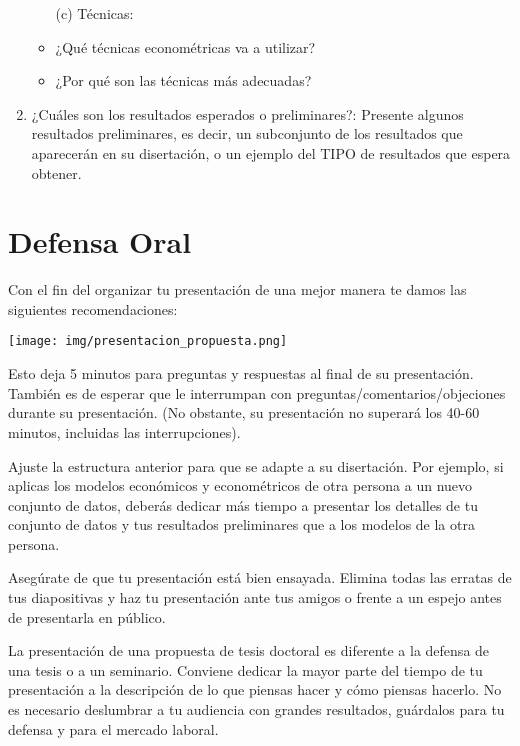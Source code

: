 \begin{enumerate}
\begin{itemize}
    \item[(c)] Técnicas:

    \item ¿Qué técnicas econométricas va a utilizar?
    \item ¿Por qué son las técnicas más adecuadas?

\end{itemize}

\item ¿Cuáles son los resultados esperados o preliminares?: Presente algunos resultados preliminares, es decir, un subconjunto de los resultados que aparecerán en su disertación, o un ejemplo del TIPO de resultados que espera obtener.

\end{enumerate}

\section{Defensa Oral}

Con el fin del organizar tu presentación de una mejor manera te damos las siguientes recomendaciones:

\texttt{[image: img/presentacion\_propuesta.png]}

Esto deja 5 minutos para preguntas y respuestas al final de su presentación. También es de esperar que le interrumpan con preguntas/comentarios/objeciones durante su presentación. (No obstante, su presentación no superará los 40-60 minutos, incluidas las interrupciones).

Ajuste la estructura anterior para que se adapte a su disertación. Por ejemplo, si aplicas los modelos económicos y econométricos de otra persona a un nuevo conjunto de datos, deberás dedicar más tiempo a presentar los detalles de tu conjunto de datos y tus resultados preliminares que a los modelos de la otra persona.

Asegúrate de que tu presentación está bien ensayada. Elimina todas las erratas de tus diapositivas y haz tu presentación ante tus amigos o frente a un espejo antes de presentarla en público.


La presentación de una propuesta de tesis doctoral es diferente a la defensa de una tesis o a un seminario. Conviene dedicar la mayor parte del tiempo de tu presentación a la descripción de lo que piensas hacer y cómo piensas hacerlo. No es necesario deslumbrar a tu audiencia con grandes resultados, guárdalos para tu defensa y para el mercado laboral.

